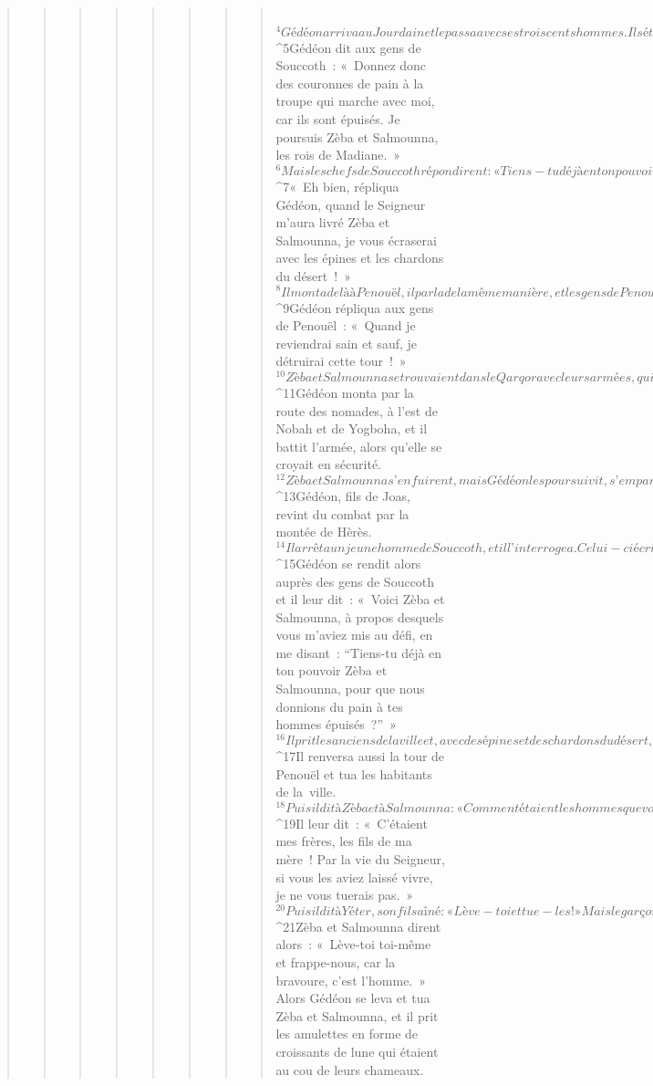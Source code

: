 \begin{verse}
\begin{verse}
\begin{verse}
\begin{verse}
\begin{verse}
\begin{verse}
\begin{verse}
\begin{verse}
         
${}^{4}Gédéon arriva au Jourdain et le passa avec ses trois cents hommes. Ils étaient épuisés par la poursuite. 
${}^{5}Gédéon dit aux gens de Souccoth : « Donnez donc des couronnes de pain à la troupe qui marche avec moi, car ils sont épuisés. Je poursuis Zèba et Salmounna, les rois de Madiane. » 
${}^{6}Mais les chefs de Souccoth répondirent : « Tiens-tu déjà en ton pouvoir Zèba et Salmounna, pour que nous donnions du pain à ton armée ? » 
${}^{7}« Eh bien, répliqua Gédéon, quand le Seigneur m’aura livré Zèba et Salmounna, je vous écraserai avec les épines et les chardons du désert ! » 
${}^{8}Il monta de là à Penouël, il parla de la même manière, et les gens de Penouël répondirent comme l’avaient fait les gens de Souccoth. 
${}^{9}Gédéon répliqua aux gens de Penouël : « Quand je reviendrai sain et sauf, je détruirai cette tour ! »
${}^{10}Zèba et Salmounna se trouvaient dans le Qarqor avec leurs armées, qui comptaient environ quinze mille hommes, tout ce qui restait de l’armée des fils de l’Orient : cent vingt mille guerriers étaient tombés. 
${}^{11}Gédéon monta par la route des nomades, à l’est de Nobah et de Yogboha, et il battit l’armée, alors qu’elle se croyait en sécurité. 
${}^{12}Zèba et Salmounna s’enfuirent, mais Gédéon les poursuivit, s’empara des deux rois de Madiane et sema la panique dans toute l’armée.
${}^{13}Gédéon, fils de Joas, revint du combat par la montée de Hèrès. 
${}^{14}Il arrêta un jeune homme de Souccoth, et il l’interrogea. Celui-ci écrivit pour lui les noms des chefs et des anciens de Souccoth : soixante-dix-sept hommes. 
${}^{15}Gédéon se rendit alors auprès des gens de Souccoth et il leur dit : « Voici Zèba et Salmounna, à propos desquels vous m’aviez mis au défi, en me disant : “Tiens-tu déjà en ton pouvoir Zèba et Salmounna, pour que nous donnions du pain à tes hommes épuisés ?” » 
${}^{16}Il prit les anciens de la ville et, avec des épines et des chardons du désert, il donna une leçon aux hommes de Souccoth. 
${}^{17}Il renversa aussi la tour de Penouël et tua les habitants de la ville.
${}^{18}Puis il dit à Zèba et à Salmounna : « Comment étaient les hommes que vous avez tués au Tabor ? » Ils répondirent : « Ils étaient comme toi. Ils avaient chacun l’air d’un fils de roi. » 
${}^{19}Il leur dit : « C’étaient mes frères, les fils de ma mère ! Par la vie du Seigneur, si vous les aviez laissé vivre, je ne vous tuerais pas. » 
${}^{20}Puis il dit à Yéter, son fils aîné : « Lève-toi et tue-les ! » Mais le garçon ne tira pas son épée : il n’osait pas, car il était encore jeune. 
${}^{21}Zèba et Salmounna dirent alors : « Lève-toi toi-même et frappe-nous, car la bravoure, c’est l’homme. » Alors Gédéon se leva et tua Zèba et Salmounna, et il prit les amulettes en forme de croissants de lune qui étaient au cou de leurs chameaux.

\end{verse}
\end{verse}
\end{verse}
\end{verse}
\end{verse}
\end{verse}
\end{verse}
\end{verse}
